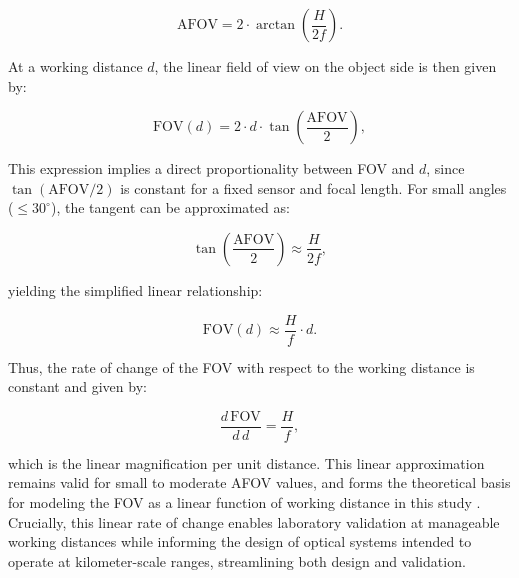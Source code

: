\begin{equation}
\text{AFOV} = 2 \cdot \arctan\left(\frac{H}{2f}\right).
\end{equation}

\noindent
At a working distance $d$, the linear field of view on the object side is then given by:

\begin{equation}
\text{FOV}(d) = 2 \cdot d \cdot \tan\left(\frac{\text{AFOV}}{2}\right),
\label{eq:fov_linear}
\end{equation}

\noindent
This expression implies a direct proportionality between FOV and $d$, since $\tan(\text{AFOV}/2)$ is constant for a fixed sensor and focal length. For small angles ($\leq 30^\circ$), the tangent can be approximated as:

\begin{equation}
\tan\left(\frac{\text{AFOV}}{2}\right) \approx \frac{H}{2f},
\end{equation}

\noindent
yielding the simplified linear relationship:

\begin{equation}
\text{FOV}(d) \approx \frac{H}{f} \cdot d.
\end{equation}

\noindent
Thus, the rate of change of the FOV with respect to the working distance is constant and given by:

\begin{equation}
\frac{d\,\text{FOV}}{d\,d} = \frac{H}{f},
\end{equation}

\noindent
which is the linear magnification per unit distance. This linear approximation remains valid for small to moderate AFOV values, and forms the theoretical basis for modeling the FOV as a linear function of working distance in this study \cite{Hecht2002Optics}. Crucially, this linear rate of change enables laboratory validation at manageable working distances while informing the design of optical systems intended to operate at kilometer-scale ranges, streamlining both design and validation.\\


